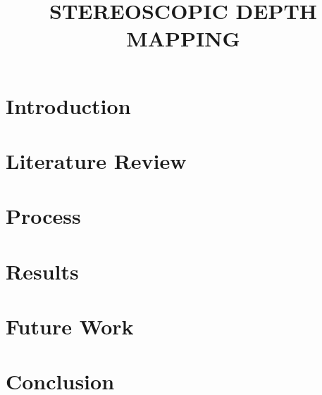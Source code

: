\documentclass{article}
\begin{document}
\sloppy

\title{STEREOSCOPIC DEPTH MAPPING}
\address{Rose-Hulman Institute of Technology\\
Terre Haute, Indiana}

\maketitle
\thispagestyle{fancy} \fancyhead{} \lhead{}
\renewcommand{\headrulewidth}{0pt}
\renewcommand{\footrulewidth}{0pt}



\section{Introduction}
\label{sec:intro}


\section{Literature Review}
\label{sec:litreview}


\section{Process}
\label{sec:Process}


\section{Results}
\label{sec:Results}


\section{Future Work}
\label{sec:future}


\section{Conclusion}
\label{sec:conclusion}

\end{document}
